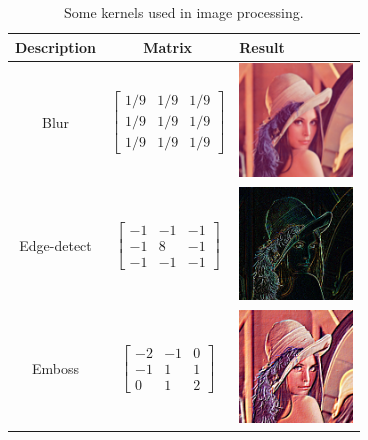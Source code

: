 \begin{table}
    \centering
    \begin{tabular}{ccm{3cm}}
    Description & Matrix & Result \\
    \hline
    Blur & $
            \begin{bmatrix}
            1/9 & 1/9 & 1/9 \\
            1/9 & 1/9 & 1/9 \\
            1/9 & 1/9 & 1/9
            \end{bmatrix}
        $ & \includegraphics[width=3cm]{img/LenaBlurred} \\
    Edge-detect & $
            \begin{bmatrix}
            -1 & -1 & -1 \\
            -1 & 8 & -1 \\
            -1 & -1 & -1
            \end{bmatrix}
        $ & \includegraphics[width=3cm]{img/LenaEdge} \\
    Emboss & $
            \begin{bmatrix}
            -2 & -1 & 0 \\
            -1 & 1 & 1 \\
            0 & 1 & 2
            \end{bmatrix}
        $ & \includegraphics[width=3cm]{img/LenaEmbossed}
    \end{tabular}
    \caption{Some kernels used in image processing.}
    \label{tab:KernelMatrices}
\end{table}


